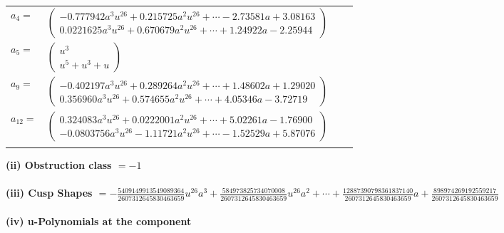 \documentclass[1p]{elsarticle_modified}
\theoremstyle{definition}
\begin{document}
\begin{tabular}{m{7pt} m{180pt} m{7pt} m{180pt} }
\flushright $a_{4}=$&$\begin{pmatrix}-0.777942 a^{3} u^{26}+0.215725 a^{2} u^{26}+\cdots-2.73581 a+3.08163\\0.0221625 a^{3} u^{26}+0.670679 a^{2} u^{26}+\cdots+1.24922 a-2.25944\end{pmatrix}$ \\
\flushright $a_{5}=$&$\begin{pmatrix}u^3\\u^5+u^3+u\end{pmatrix}$ \\
\flushright $a_{9}=$&$\begin{pmatrix}-0.402197 a^{3} u^{26}+0.289264 a^{2} u^{26}+\cdots+1.48602 a+1.29020\\0.356960 a^{3} u^{26}+0.574655 a^{2} u^{26}+\cdots+4.05346 a-3.72719\end{pmatrix}$ \\
\flushright $a_{12}=$&$\begin{pmatrix}0.324083 a^{3} u^{26}+0.0222001 a^{2} u^{26}+\cdots+5.02261 a-1.76900\\-0.0803756 a^{3} u^{26}-1.11721 a^{2} u^{26}+\cdots-1.52529 a+5.87076\end{pmatrix}$\\&\end{tabular}
\flushleft \textbf{(ii) Obstruction class $= -1$}\\~\\
\flushleft \textbf{(iii) Cusp Shapes $= -\frac{5409149913549089364}{2607312645830463659} u^{26} a^3+\frac{584973825734070008}{2607312645830463659} u^{26} a^2+\cdots+\frac{12887390798361837140}{2607312645830463659} a+\frac{898974269192559217}{2607312645830463659}$}\\~\\
\newpage\renewcommand{\arraystretch}{1}
\flushleft \textbf{(iv) u-Polynomials at the component}\newline \\
\end{document}
